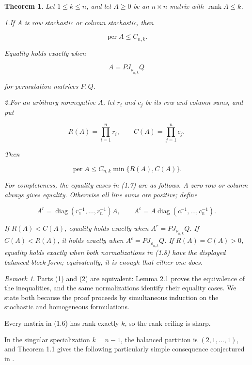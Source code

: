 \documentclass[11pt]{article}
\newtheorem{theorem}{Theorem}[section]
\theoremstyle{remark}
\newtheorem*{remark}{Remark}
\begin{document}
\begin{theorem}
Let
\(1\leq k\leq n\), and let \(A\geq0\) be an \(n\times n\) matrix with
\(\operatorname{rank}A\leq k\).

\par\smallskip
\noindent\textup{1.}\enspace If \(A\) is row stochastic or column stochastic,
then

\[
 \boxed{\operatorname{per}A\leq C_{n,k}.}                \tag{1.5}
\]

Equality holds exactly when

\[
 A=PJ_{\rho_{n,k}}Q                                      \tag{1.6}
\]

for permutation matrices \(P,Q\).

\par\smallskip
\noindent\textup{2.}\enspace For an arbitrary nonnegative \(A\), let \(r_i\)
and \(c_j\) be its row and column sums, and put

\[
 R(A)=\prod_{i=1}^n r_i,
 \qquad
 C(A)=\prod_{j=1}^n c_j.
\]

Then

\[
 \boxed{
 \operatorname{per}A
 \leq C_{n,k}\min\{R(A),C(A)\}.}                         \tag{1.7}
\]

For completeness, the equality cases in (1.7) are as follows. A zero row or
column always gives equality. Otherwise all line sums are positive; define

\[
 A^r=\operatorname{diag}(r_1^{-1},\ldots,r_n^{-1})A,
 \qquad
 A^c=A\operatorname{diag}(c_1^{-1},\ldots,c_n^{-1}).        \tag{1.8}
\]

If \(R(A)<C(A)\), equality holds exactly when
\(A^r=PJ_{\rho_{n,k}}Q\). If \(C(A)<R(A)\), it holds exactly when
\(A^c=PJ_{\rho_{n,k}}Q\). If \(R(A)=C(A)>0\), equality holds exactly when
both normalizations in (1.8) have the displayed balanced-block form;
equivalently, it is enough that either one does.
\end{theorem}

\begin{remark}
Parts (1) and (2) are equivalent: Lemma 2.1 proves the
equivalence of the inequalities, and the same normalizations identify their
equality cases. We state both because the proof proceeds by simultaneous
induction on the stochastic and homogeneous formulations.
\end{remark}

Every matrix in (1.6) has rank exactly \(k\), so the rank ceiling is sharp.

In the singular specialization \(k=n-1\), the balanced partition is
\((2,1,\ldots,1)\), and Theorem 1.1 gives the following particularly simple
consequence conjectured in \cite{lavi2018}.
\end{document}
